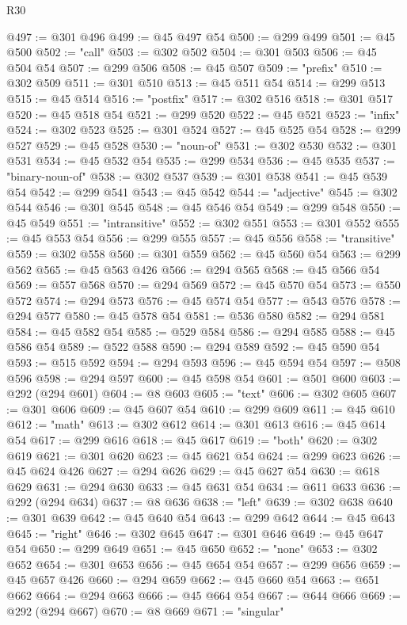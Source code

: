 \begin{lexlean}{R30}
\begin{coremodule}
@497 := @301 @496
@499 := @45 @497 @54
@500 := @299 @499
@501 := @45 @500
@502 := "call"
@503 := @302 @502
@504 := @301 @503
@506 := @45 @504 @54
@507 := @299 @506
@508 := @45 @507
@509 := "prefix"
@510 := @302 @509
@511 := @301 @510
@513 := @45 @511 @54
@514 := @299 @513
@515 := @45 @514
@516 := "postfix"
@517 := @302 @516
@518 := @301 @517
@520 := @45 @518 @54
@521 := @299 @520
@522 := @45 @521
@523 := "infix"
@524 := @302 @523
@525 := @301 @524
@527 := @45 @525 @54
@528 := @299 @527
@529 := @45 @528
@530 := "noun-of"
@531 := @302 @530
@532 := @301 @531
@534 := @45 @532 @54
@535 := @299 @534
@536 := @45 @535
@537 := "binary-noun-of"
@538 := @302 @537
@539 := @301 @538
@541 := @45 @539 @54
@542 := @299 @541
@543 := @45 @542
@544 := "adjective"
@545 := @302 @544
@546 := @301 @545
@548 := @45 @546 @54
@549 := @299 @548
@550 := @45 @549
@551 := "intransitive"
@552 := @302 @551
@553 := @301 @552
@555 := @45 @553 @54
@556 := @299 @555
@557 := @45 @556
@558 := "transitive"
@559 := @302 @558
@560 := @301 @559
@562 := @45 @560 @54
@563 := @299 @562
@565 := @45 @563 @426
@566 := @294 @565
@568 := @45 @566 @54
@569 := @557 @568
@570 := @294 @569
@572 := @45 @570 @54
@573 := @550 @572
@574 := @294 @573
@576 := @45 @574 @54
@577 := @543 @576
@578 := @294 @577
@580 := @45 @578 @54
@581 := @536 @580
@582 := @294 @581
@584 := @45 @582 @54
@585 := @529 @584
@586 := @294 @585
@588 := @45 @586 @54
@589 := @522 @588
@590 := @294 @589
@592 := @45 @590 @54
@593 := @515 @592
@594 := @294 @593
@596 := @45 @594 @54
@597 := @508 @596
@598 := @294 @597
@600 := @45 @598 @54
@601 := @501 @600
@603 := @292 (@294 @601)
@604 := @8 @603
@605 := "text"
@606 := @302 @605
@607 := @301 @606
@609 := @45 @607 @54
@610 := @299 @609
@611 := @45 @610
@612 := "math"
@613 := @302 @612
@614 := @301 @613
@616 := @45 @614 @54
@617 := @299 @616
@618 := @45 @617
@619 := "both"
@620 := @302 @619
@621 := @301 @620
@623 := @45 @621 @54
@624 := @299 @623
@626 := @45 @624 @426
@627 := @294 @626
@629 := @45 @627 @54
@630 := @618 @629
@631 := @294 @630
@633 := @45 @631 @54
@634 := @611 @633
@636 := @292 (@294 @634)
@637 := @8 @636
@638 := "left"
@639 := @302 @638
@640 := @301 @639
@642 := @45 @640 @54
@643 := @299 @642
@644 := @45 @643
@645 := "right"
@646 := @302 @645
@647 := @301 @646
@649 := @45 @647 @54
@650 := @299 @649
@651 := @45 @650
@652 := "none"
@653 := @302 @652
@654 := @301 @653
@656 := @45 @654 @54
@657 := @299 @656
@659 := @45 @657 @426
@660 := @294 @659
@662 := @45 @660 @54
@663 := @651 @662
@664 := @294 @663
@666 := @45 @664 @54
@667 := @644 @666
@669 := @292 (@294 @667)
@670 := @8 @669
@671 := "singular"

\end{coremodule}
\end{lexlean}
